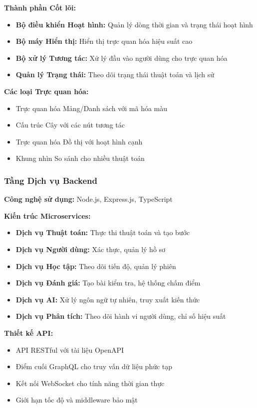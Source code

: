 \textbf{Thành phần Cốt lõi:}
\begin{itemize}
    \item \textbf{Bộ điều khiển Hoạt hình:} Quản lý dòng thời gian và trạng thái hoạt hình
    \item \textbf{Bộ máy Hiển thị:} Hiển thị trực quan hóa hiệu suất cao
    \item \textbf{Bộ xử lý Tương tác:} Xử lý đầu vào người dùng cho trực quan hóa
    \item \textbf{Quản lý Trạng thái:} Theo dõi trạng thái thuật toán và lịch sử
\end{itemize}

\textbf{Các loại Trực quan hóa:}
\begin{itemize}
    \item Trực quan hóa Mảng/Danh sách với mã hóa màu
    \item Cấu trúc Cây với các nút tương tác
    \item Trực quan hóa Đồ thị với hoạt hình cạnh
    \item Khung nhìn So sánh cho nhiều thuật toán
\end{itemize}

\subsubsection{Tầng Dịch vụ Backend}
\textbf{Công nghệ sử dụng:} Node.js, Express.js, TypeScript

\textbf{Kiến trúc Microservices:}
\begin{itemize}
    \item \textbf{Dịch vụ Thuật toán:} Thực thi thuật toán và tạo bước
    \item \textbf{Dịch vụ Người dùng:} Xác thực, quản lý hồ sơ
    \item \textbf{Dịch vụ Học tập:} Theo dõi tiến độ, quản lý phiên
    \item \textbf{Dịch vụ Đánh giá:} Tạo bài kiểm tra, hệ thống chấm điểm
    \item \textbf{Dịch vụ AI:} Xử lý ngôn ngữ tự nhiên, truy xuất kiến thức
    \item \textbf{Dịch vụ Phân tích:} Theo dõi hành vi người dùng, chỉ số hiệu suất
\end{itemize}

\textbf{Thiết kế API:}
\begin{itemize}
    \item API RESTful với tài liệu OpenAPI
    \item Điểm cuối GraphQL cho truy vấn dữ liệu phức tạp
    \item Kết nối WebSocket cho tính năng thời gian thực
    \item Giới hạn tốc độ và middleware bảo mật
\end{itemize}

